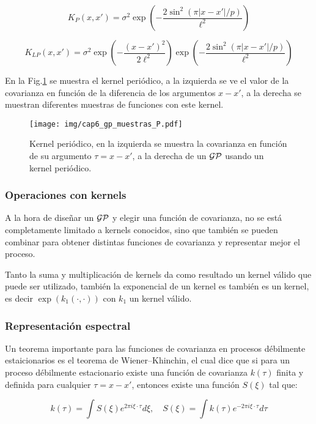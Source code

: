\begin{equation}\label{eq:gp_kernel_p}
	K_{P}(x, x') = \sigma^2 \exp\left(-\frac{2\sin^2\left(\pi |x- x'| / p \right)}{\ell^2 } \right)
\end{equation}

\begin{equation}\label{eq:gp_kernel_lp}
	K_{LP}(x, x') = \sigma^2  \exp\left(-\frac{\left(x- x' \right)^2}{2\ell^2 } \right) \exp\left(-\frac{2\sin^2\left(\pi |x- x'| / p \right)}{\ell^2 } \right)
\end{equation}

En la Fig.\ref{fig:gp_7} se muestra el kernel periódico, a la izquierda se ve el valor de la covarianza en función de la diferencia de los argumentos $x-x'$, a la derecha se muestran diferentes muestras de funciones con este kernel.

\begin{figure}[H]
	\centering
	\texttt{[image: img/cap6\_gp\_muestras\_P.pdf]}
	\caption{Kernel periódico, en la izquierda se muestra la covarianza en función de su argumento $\tau=x-x'$, a la derecha de un $\mathcal{GP}$ usando un kernel periódico.}
	\label{fig:gp_7}
\end{figure}

\subsubsection{Operaciones con kernels}
A la hora de diseñar un $\mathcal{GP}$ y elegir una función de covarianza, no se está completamente limitado a kernels conocidos, sino que también se pueden combinar para obtener distintas funciones de covarianza y representar mejor el proceso.

Tanto la suma y multiplicación de kernels da como resultado un kernel válido que puede ser utilizado, también la exponencial de un kernel es también es un kernel, es decir $\exp(k_1(\cdot, \cdot))$ con $k_1$ un kernel válido.

\subsubsection{Representación espectral}
Un teorema importante para las funciones de covarianza en procesos débilmente estaicionarios es el teorema de Wiener–Khinchin, el cual dice que si para un proceso débilmente estacionario existe una función de covarianza $k(\tau)$ finita y definida para cualquier $\tau=x-x'$, entonces existe una función $S(\xi)$ tal que:

\begin{equation}\label{eq:gp_spectral}
	k(\tau) = \int S(\xi)e^{2\pi i \xi \cdot \tau} d\xi, \quad S(\xi)=\int k(\tau)e^{-2\pi i \xi \cdot \tau} d\tau
\end{equation}

